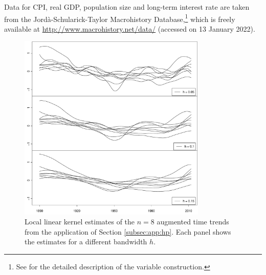\documentclass[a4paper,12pt]{article}
\begin{document}

Data for CPI, real GDP, population size and long-term interest rate are taken from the Jordà-Schularick-Taylor Macrohistory Database,\footnote{See \cite{Jorda2017} for the detailed description of the variable construction.} which is freely available at \linebreak\url{http://www.macrohistory.net/data/} (accessed on 13 January 2022).

\begin{figure}[t!]
\centering
\includegraphics[width=0.8\textwidth]{Plots/hp/smoothed_hp_data_augmented.pdf}
\vspace{0.2cm}
\caption{Local linear kernel estimates of the $n=8$ augmented time trends from the application of Section \ref{subsec:app:hp}. Each panel shows the estimates for a different bandwidth $h$.}\label{fig:app:hp_augm}
\end{figure}
\end{document}
